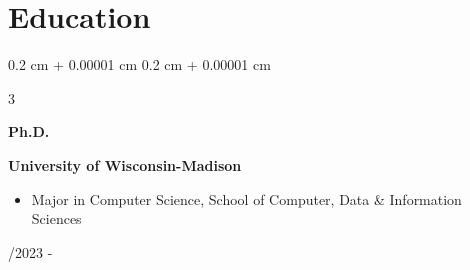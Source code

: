 \documentclass[10pt, letterpaper]{article}
\newenvironment{highlights}{
    \begin{itemize}[
        topsep=0.10 cm,
        parsep=0.10 cm,
        partopsep=0pt,
        itemsep=0pt,
        leftmargin=0.4 cm + 10pt
    ]
}{
    \end{itemize}
} %
\newenvironment{highlightsforbulletentries}{
    \begin{itemize}[
        topsep=0.10 cm,
        parsep=0.10 cm,
        partopsep=0pt,
        itemsep=0pt,
        leftmargin=10pt
    ]
}{
    \end{itemize}
} %
\newenvironment{onecolentry}{
    \begin{adjustwidth}{
        0.2 cm + 0.00001 cm
    }{
        0.2 cm + 0.00001 cm
    }
}{
    \end{adjustwidth}
} %
\newenvironment{threecolentry}[3][]{
    \onecolentry
    \def\thirdColumn{#3}
    \setcolumnwidth{1 cm, \fill, 4.5 cm}
    \begin{paracol}{3}
    {\raggedright #2} \switchcolumn
}{
    \switchcolumn \raggedleft \thirdColumn
    \end{paracol}
    \endonecolentry
} %
\let\hrefWithoutArrow\href
\renewcommand{\href}[2]{\hrefWithoutArrow{#1}{\ifthenelse{\equal{#2}{}}{ }{#2 }\raisebox{.15ex}{\footnotesize \faExternalLink*}}}
\begin{document}



    









    \section{Education}

        \begin{threecolentry}{\textbf{Ph.D.}}{
            08/2023 - 
        }
            \textbf{University of Wisconsin-Madison}
            \begin{highlights}
                \item Major in Computer Science, School of Computer, Data \& Information Sciences
            \end{highlights}
        \end{threecolentry}
\end{document}

